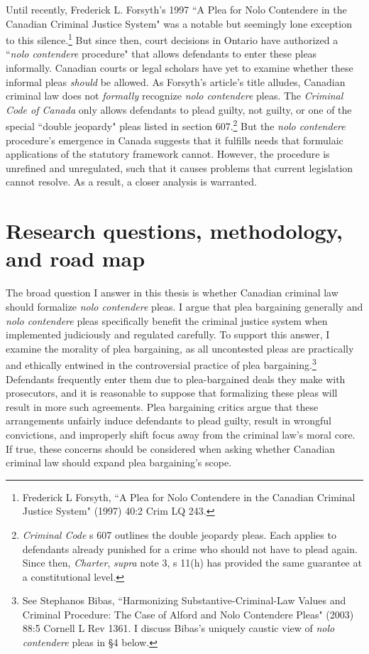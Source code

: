 Until recently, Frederick L. Forsyth's 1997 ``A Plea for Nolo Contendere in the Canadian Criminal Justice System" was a notable but seemingly lone exception to this silence.\footnote{Frederick L Forsyth, ``A Plea for Nolo Contendere in the Canadian Criminal Justice System" (1997) 40:2 Crim LQ 243.} But since then, court decisions in Ontario have authorized a ``\textit{nolo contendere} procedure" that allows defendants to enter these pleas informally. Canadian courts or legal scholars have yet to examine whether these informal pleas \textit{should} be allowed. As Forsyth's article's title alludes, Canadian criminal law does not \textit{formally} recognize \textit{nolo contendere} pleas. The \textit{Criminal Code of Canada} only allows defendants to plead guilty, not guilty, or one of the special ``double jeopardy" pleas listed in section 607.\footnote{\textit{Criminal Code} s 607 outlines the double jeopardy pleas. Each applies to defendants already punished for a crime who should not have to plead again. Since then, \textit{Charter}, \textit{supra} note 3, s 11(h) has provided the same guarantee at a constitutional level.} But the \textit{nolo contendere} procedure's emergence in Canada suggests that it fulfills needs that formulaic applications of the statutory framework cannot. However, the procedure is unrefined and unregulated, such that it causes problems that current legislation cannot resolve. As a result, a closer analysis is warranted.

\section{Research questions, methodology, and road map}

The broad question I answer in this thesis is whether Canadian criminal law should formalize \textit{nolo contendere} pleas. I argue that plea bargaining generally and \textit{nolo contendere} pleas specifically benefit the criminal justice system when implemented judiciously and regulated carefully. To support this answer, I examine the morality of plea bargaining, as all uncontested pleas are practically and ethically entwined in the controversial practice of plea bargaining.\footnote{See Stephanos Bibas, ``Harmonizing Substantive-Criminal-Law Values and Criminal Procedure:
The Case of Alford and Nolo Contendere Pleas" (2003) 88:5 Cornell L Rev 1361. I discuss Bibas's uniquely caustic view of \textit{nolo contendere} pleas in \S4 below.} Defendants frequently enter them due to plea-bargained deals they make with prosecutors, and it is reasonable to suppose that formalizing these pleas will result in more such agreements. Plea bargaining critics argue that these arrangements unfairly induce defendants to plead guilty, result in wrongful convictions, and improperly shift focus away from the criminal law's moral core. If true, these concerns should be considered when asking whether Canadian criminal law should expand plea bargaining's scope.

